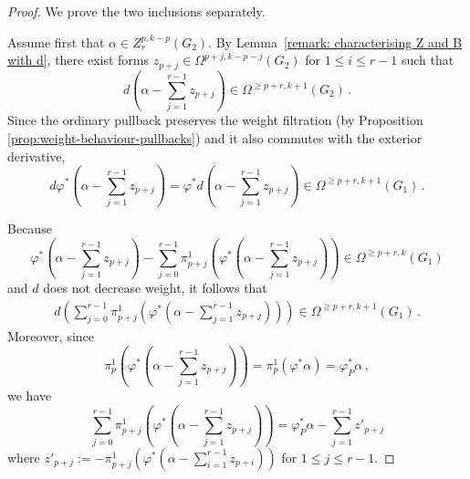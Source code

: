 \documentclass[dvipsnames]{amsart}
\theoremstyle{definition}
\theoremstyle{definition}
\numberwithin{equation}{section}
\begin{document}
\begin{proof}
We prove the two inclusions separately.

Assume first that $\alpha\in Z_r^{p,k-p}(G_2)$.
By Lemma~\ref{remark: characterising Z and B with d}, there exist forms $z_{p+j}\in\Omega^{p+j,k-p-j}(G_2)$ for $1\le i\le r-1$ such that
\[
d\left(\alpha-\sum_{j=1}^{r-1}z_{p+j}\right)\in\Omega^{\geq p+r,k+1}(G_2)\,.
\]
Since the ordinary pullback preserves the weight filtration (by Proposition \ref{prop:weight-behaviour-pullbacks}) and it
also commutes with the exterior derivative,
\[
d\varphi^*\left(\alpha-\sum_{j=1}^{r-1}z_{p+j}\right)
=
\varphi^*d\left(\alpha-\sum_{j=1}^{r-1}z_{p+j}\right)
\in
\Omega^{\geq p+r,k+1}(G_1)\,.
\]

Because
\[
\varphi^*\left(\alpha-\sum_{j=1}^{r-1}z_{p+j}\right)-\sum_{j=0}^{r-1}
\pi_{p+j}^1\left(\varphi^*\left(\alpha-\sum_{j=1}^{r-1}z_{p+j}\right)\right)
\in
\Omega^{\geq p+r,k}(G_1)
\]
and \(d\) does not decrease weight, it follows that
\begin{align}\label{eq: then Z_r}
d\left(\sum_{j=0}^{r-1}
\pi_{p+j}^1\left(\varphi^*\left(\alpha-\sum_{j=1}^{r-1}z_{p+j}\right)\right)\right)
\in
\Omega^{\geq p+r,k+1}(G_1)\,.
\end{align}
Moreover, since
\[
\pi_p^1\left(\varphi^*\left(\alpha-\sum_{j=1}^{r-1}z_{p+j}\right)\right)
=
\pi_p^1(\varphi^*\alpha)
=
\varphi_P^*\alpha\,,
\] we have
$$\sum_{j=0}^{r-1}
\pi_{p+j}^1\left(\varphi^*\left(\alpha-\sum_{j=1}^{r-1}z_{p+j}\right)\right)=\varphi_P^\ast\alpha-\sum_{j=1}^{r-1}z'_{p+j}$$
where $z'_{p+j}
:=
-\pi_{p+j}^1(\varphi^*(\alpha-\sum_{i=1}^{r-1}z_{p+i}))$ for \(1\leq j\leq r-1\).


\end{proof}
\end{document}
